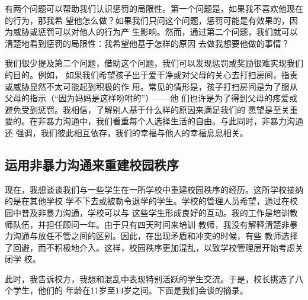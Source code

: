 \documentclass{ctexart}
\begin{document}
有两个问题可以帮助我们认识惩罚的局限性。第一个问题是，如果我不喜欢他现在的行为，那我希
望他怎么做？如果我们只问这个问题，惩罚可能是有效果的，因为威胁或惩罚可以对他人的行为产
生影响。然而，通过第二个问题，我们就可以清楚地看到惩罚的局限性：我希望他基于怎样的原因
去做我想要他做的事情？

我们很少提及第二个问题，借助这个问题，我们可以发现惩罚或奖励很难实现我们的目的。例如，
如果我们希望孩子出于爱干净或对父母的关心去打扫房间，指责或威胁显然不太可能起到积极的作
用。常见的情形是，孩子打扫房间是为了服从父母的指示（``因为妈妈是这样吩咐的''）------他
们也许是为了得到父母的疼爱或避免受到惩罚。我相信，了解别人基于什么样的原因来满足我们的
愿望是至关重要的。在非暴力沟通中，我们看重每个人选择生活的自由。与此同时，非暴力沟通还
强调，我们彼此相互依存，我们的幸福与他人的幸福息息相关。


\subsection{运用非暴力沟通来重建校园秩序}

现在，我想谈谈我们与一些学生在一所学校中重建校园秩序的经历。这所学校接纳的是在其他学校
学不下去或被勒令退学的学生。学校的管理人员希望，通过在校园中普及非暴力沟通，学校可以与
这些学生形成良好的互动。我的工作是培训教师队伍，并担任顾问一年。由于只有四天时间来培训
教师，我没有解释清楚非暴力沟通与放任不管之间的区别。因此，在出现矛盾和冲突的时候，有些
教师选择了回避，而不积极地介入。这样，校园秩序更加混乱，以致学校管理层开始考虑关闭学
校。

此时，我告诉校方，我想和混乱中表现特别活跃的学生交流。于是，校长挑选了八个学生，他们的
年龄在11岁至14岁之间。下面是我们会谈的摘录。
\end{document}
